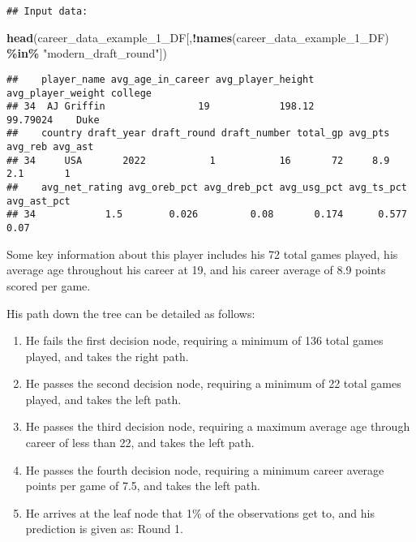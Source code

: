 \documentclass[
]{article}
\newenvironment{Shaded}{\begin{snugshade}}{\end{snugshade}}
\newcommand{\FunctionTok}[1]{\textcolor[rgb]{0.13,0.29,0.53}{\textbf{#1}}}
\newcommand{\NormalTok}[1]{#1}
\newcommand{\SpecialCharTok}[1]{\textcolor[rgb]{0.81,0.36,0.00}{\textbf{#1}}}
\newcommand{\StringTok}[1]{\textcolor[rgb]{0.31,0.60,0.02}{#1}}
\providecommand{\tightlist}{%
  \setlength{\itemsep}{0pt}\setlength{\parskip}{0pt}}
\begin{document}
\begin{verbatim}
## Input data:
\end{verbatim}

\begin{Shaded}
\begin{Highlighting}[]
\FunctionTok{head}\NormalTok{(career\_data\_example\_1\_DF[,}\SpecialCharTok{!}\FunctionTok{names}\NormalTok{(career\_data\_example\_1\_DF) }\SpecialCharTok{\%in\%} \StringTok{"modern\_draft\_round"}\NormalTok{])}
\end{Highlighting}
\end{Shaded}

\begin{verbatim}
##    player_name avg_age_in_career avg_player_height avg_player_weight college
## 34  AJ Griffin                19            198.12          99.79024    Duke
##    country draft_year draft_round draft_number total_gp avg_pts avg_reb avg_ast
## 34     USA       2022           1           16       72     8.9     2.1       1
##    avg_net_rating avg_oreb_pct avg_dreb_pct avg_usg_pct avg_ts_pct avg_ast_pct
## 34            1.5        0.026         0.08       0.174      0.577        0.07
\end{verbatim}

Some key information about this player includes his 72 total games
played, his average age throughout his career at 19, and his career
average of 8.9 points scored per game.

His path down the tree can be detailed as follows:

\begin{enumerate}
\def\labelenumi{\arabic{enumi}.}
\tightlist
\item
  He fails the first decision node, requiring a minimum of 136 total
  games played, and takes the right path.
\item
  He passes the second decision node, requiring a minimum of 22 total
  games played, and takes the left path.
\item
  He passes the third decision node, requiring a maximum average age
  through career of less than 22, and takes the left path.
\item
  He passes the fourth decision node, requiring a minimum career average
  points per game of 7.5, and takes the left path.
\item
  He arrives at the leaf node that 1\% of the observations get to, and
  his prediction is given as: Round 1.
\end{enumerate}
\end{document}
